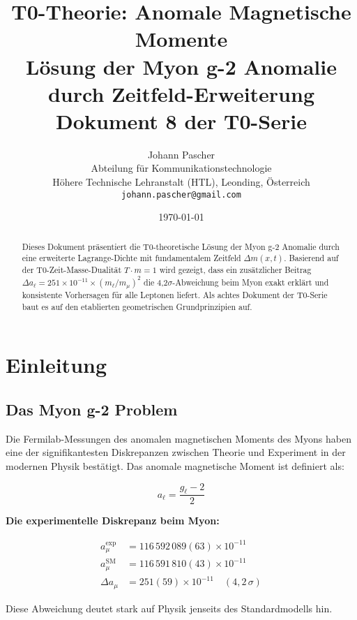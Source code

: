 \documentclass[12pt,a4paper]{article}
\title{\textbf{T0-Theorie: Anomale Magnetische Momente}\\[0.5cm]
	\large Lösung der Myon g-2 Anomalie durch Zeitfeld-Erweiterung\\[0.3cm]
	\normalsize Dokument 8 der T0-Serie}
\author{Johann Pascher\\
	Abteilung für Kommunikationstechnologie\\
	Höhere Technische Lehranstalt (HTL), Leonding, Österreich\\
	\texttt{johann.pascher@gmail.com}}
\date{\today}
\newcommand{\Deltam}{\Delta m}
\begin{document}
	
	\maketitle
	
	\begin{abstract}
		Dieses Dokument präsentiert die T0-theoretische Lösung der Myon g-2 Anomalie durch eine erweiterte Lagrange-Dichte mit fundamentalem Zeitfeld $\Deltam(x,t)$. Basierend auf der T0-Zeit-Masse-Dualität $T \cdot m = 1$ wird gezeigt, dass ein zusätzlicher Beitrag $\Delta a_\ell = 251 \times 10^{-11} \times (m_\ell/m_\mu)^2$ die 4,2$\sigma$-Abweichung beim Myon exakt erklärt und konsistente Vorhersagen für alle Leptonen liefert. Als achtes Dokument der T0-Serie baut es auf den etablierten geometrischen Grundprinzipien auf.
	\end{abstract}
	
	\tableofcontents
	\newpage
	
	\section{Einleitung}
	
	\subsection{Das Myon g-2 Problem}
	
	Die Fermilab-Messungen des anomalen magnetischen Moments des Myons haben eine der signifikantesten Diskrepanzen zwischen Theorie und Experiment in der modernen Physik bestätigt. Das anomale magnetische Moment ist definiert als:
	
	\begin{equation}
		a_\ell = \frac{g_\ell - 2}{2}
	\end{equation}
	
	\begin{keyresult}
		\textbf{Die experimentelle Diskrepanz beim Myon:}
		
		\begin{align}
			a_\mu^{\text{exp}} &= 116\,592\,089(63) \times 10^{-11}\\
			a_\mu^{\text{SM}} &= 116\,591\,810(43) \times 10^{-11}\\
			\Delta a_\mu &= 251(59) \times 10^{-11} \quad (4,2\,\sigma)
		\end{align}
		
		Diese Abweichung deutet stark auf Physik jenseits des Standardmodells hin.
	\end{keyresult}
	
\end{document}
